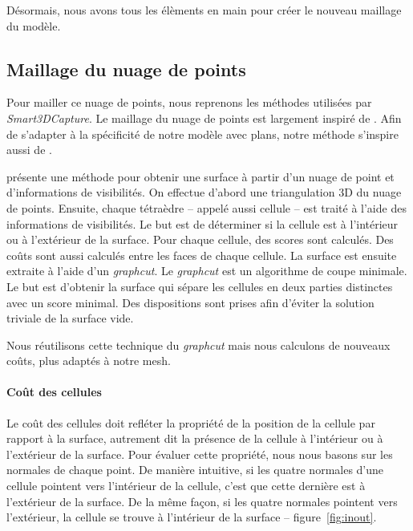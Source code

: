 ﻿\documentclass[12pt, twoside]{article}
\begin{document}
Désormais, nous avons tous les élèments en main pour créer le nouveau maillage du modèle.

\subsection{Maillage du nuage de points}
Pour mailler ce nuage de points, nous reprenons les méthodes utilisées par \textit{Smart3DCapture}. Le maillage du nuage de points est largement inspiré de \cite{maillage1}. Afin de s'adapter à la spécificité de notre modèle avec plans, notre méthode s'inspire aussi de \cite{maillage2}.

\cite{maillage1} présente une méthode pour obtenir une surface à partir d'un nuage de point et d'informations de visibilités. On effectue d'abord une triangulation 3D du nuage de points. Ensuite, chaque tétraèdre -- appelé aussi cellule -- est traité à l'aide des informations de visibilités. Le but est de déterminer si la cellule est à l'intérieur ou à l'extérieur de la surface. Pour chaque cellule, des scores sont calculés. Des coûts sont aussi calculés entre les faces de chaque cellule. La surface est ensuite extraite à l'aide d'un \textit{graphcut}. Le \textit{graphcut} est un algorithme de coupe minimale. Le but est d'obtenir la surface qui sépare les cellules en deux parties distinctes avec un score minimal. Des dispositions sont prises afin d'éviter la solution triviale de la surface vide.

Nous réutilisons cette technique du \textit{graphcut} mais nous calculons de nouveaux coûts, plus adaptés à notre mesh.

\paragraph{Coût des cellules} Le coût des cellules doit refléter la propriété de la position de la cellule par rapport à la surface, autrement dit la présence de la cellule à l'intérieur ou à l'extérieur de la surface. Pour évaluer cette propriété, nous nous basons sur les normales de chaque point. De manière intuitive, si les quatre normales d'une cellule pointent vers l'intérieur de la cellule, c'est que cette dernière est à l'extérieur de la surface. De la même façon, si les quatre normales pointent vers l'extérieur, la cellule se trouve à l'intérieur de la surface -- figure~\ref{fig:inout}.
\end{document}
